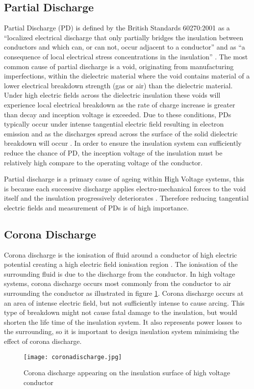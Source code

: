 \subsection{Partial Discharge}
Partial Discharge (PD) is defined by the British Standards 60270:2001 as a “localized electrical discharge that only partially bridges the insulation between conductors and which can, or can not, occur adjacent to a conductor” and as “a consequence of local electrical stress concentrations in the insulation” \cite{60270}. 
The most common cause of partial discharge is a void, originating from manufacturing imperfections, within the dielectric material where the void contains material of a lower electrical breakdown strength (gas or air) than the dielectric material. 
Under high electric fields across the dielectric insulation these voids will experience local electrical breakdown as the rate of charge increase is greater than decay and inception voltage is exceeded. 
Due to these conditions, PDs typically occur under intense tangential electric field resulting in electron emission \cite{surfaceflashover} and as the discharges spread across the surface of the solid dielectric breakdown will occur \cite{kuffel2000high}. In order to ensure the insulation system can sufficiently reduce the chance of PD, the inception voltage of the insulation must be relatively high compare to the operating voltage of the conductor.

Partial discharge is a primary cause of ageing within High Voltage systems, this is because each successive discharge applies electro-mechanical forces to the void itself and the insulation progressively deteriorates \cite{PDageing}. Therefore reducing tangential electric fields and measurement of PDs is of high importance. 

\subsection{Corona Discharge}
Corona discharge is the ionisation of fluid around a conductor of high electric potential creating a high electric field ionisation region \cite{corona}. The ionisation of the surrounding fluid is due to the discharge from the conductor. In high voltage systems, corona discharge occurs most commonly from the conductor to air surrounding the conductor as illustrated in figure \ref{figure:corona}. Corona discharge occurs at an area of intense electric field, but not sufficiently intense to cause arcing. This type of breakdown might not cause fatal damage to the insulation, but would shorten the life time of the insulation system. It also represents power losses to the surrounding, so it is important to design insulation system minimising the effect of corona discharge. 

\begin{figure}[!h]
   \centering
   \texttt{[image: coronadischarge.jpg]}
   \caption{Corona discharge appearing on the insulation surface of high voltage conductor}
   \label{figure:corona}
\end{figure}
